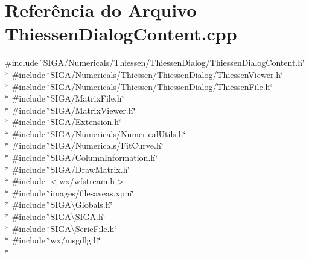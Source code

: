 \section{Referência do Arquivo Thiessen\+Dialog\+Content.\+cpp}
\label{_thiessen_dialog_content_8cpp}
{\ttfamily \#include \char`\"{}S\+I\+G\+A/\+Numericals/\+Thiessen/\+Thiessen\+Dialog/\+Thiessen\+Dialog\+Content.\+h\char`\"{}}\\*
{\ttfamily \#include \char`\"{}S\+I\+G\+A/\+Numericals/\+Thiessen/\+Thiessen\+Dialog/\+Thiessen\+Viewer.\+h\char`\"{}}\\*
{\ttfamily \#include \char`\"{}S\+I\+G\+A/\+Numericals/\+Thiessen/\+Thiessen\+Dialog/\+Thiessen\+File.\+h\char`\"{}}\\*
{\ttfamily \#include \char`\"{}S\+I\+G\+A/\+Matrix\+File.\+h\char`\"{}}\\*
{\ttfamily \#include \char`\"{}S\+I\+G\+A/\+Matrix\+Viewer.\+h\char`\"{}}\\*
{\ttfamily \#include \char`\"{}S\+I\+G\+A/\+Extension.\+h\char`\"{}}\\*
{\ttfamily \#include \char`\"{}S\+I\+G\+A/\+Numericals/\+Numerical\+Utils.\+h\char`\"{}}\\*
{\ttfamily \#include \char`\"{}S\+I\+G\+A/\+Numericals/\+Fit\+Curve.\+h\char`\"{}}\\*
{\ttfamily \#include \char`\"{}S\+I\+G\+A/\+Column\+Information.\+h\char`\"{}}\\*
{\ttfamily \#include \char`\"{}S\+I\+G\+A/\+Draw\+Matrix.\+h\char`\"{}}\\*
{\ttfamily \#include $<$wx/wfstream.\+h$>$}\\*
{\ttfamily \#include \char`\"{}images/filesaveas.\+xpm\char`\"{}}\\*
{\ttfamily \#include \char`\"{}S\+I\+G\+A\textbackslash{}\+Globals.\+h\char`\"{}}\\*
{\ttfamily \#include \char`\"{}S\+I\+G\+A\textbackslash{}\+S\+I\+G\+A.\+h\char`\"{}}\\*
{\ttfamily \#include \char`\"{}S\+I\+G\+A\textbackslash{}\+Serie\+File.\+h\char`\"{}}\\*
{\ttfamily \#include \char`\"{}wx/msgdlg.\+h\char`\"{}}\\*
